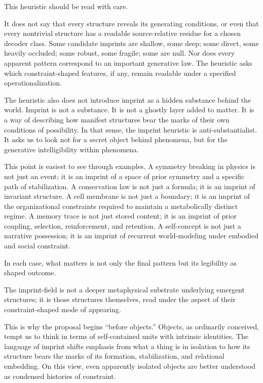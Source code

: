 \documentclass[12pt,a4paper]{article}
\begin{document}
This heuristic should be read with care.

It does not say that every structure reveals its generating conditions,
or even that every nontrivial structure has a readable source-relative
residue for a chosen decoder class. Some candidate imprints are shallow,
some deep; some direct, some heavily occluded; some robust, some fragile;
some are null. Nor does every apparent pattern correspond to an
important generative law. The heuristic asks which constraint-shaped
features, if any, remain readable under a specified operationalization.

The heuristic also does not introduce imprint as a hidden substance behind the world. Imprint is not a substance. It is not a ghostly layer added to matter. It is a way of describing how manifest structures bear the marks of their own conditions of possibility. In that sense, the imprint heuristic is anti-substantialist. It asks us to look not for a secret object behind phenomena, but for the generative intelligibility within phenomena.

This point is easiest to see through examples. A symmetry breaking in physics is not just an event; it is an imprint of a space of prior symmetry and a specific path of stabilization. A conservation law is not just a formula; it is an imprint of invariant structure. A cell membrane is not just a boundary; it is an imprint of the organizational constraints required to maintain a metabolically distinct regime. A memory trace is not just stored content; it is an imprint of prior coupling, selection, reinforcement, and retention. A self-concept is not just a narrative possession; it is an imprint of recurrent world-modeling under embodied and social constraint.

In each case, what matters is not only the final pattern but its legibility as shaped outcome.

The imprint-field is not a deeper metaphysical substrate underlying emergent structures; it is those structures themselves, read under the aspect of their constraint-shaped mode of appearing.

This is why the proposal begins ``before objects.'' Objects, as ordinarily conceived, tempt us to think in terms of self-contained units with intrinsic identities. The language of imprint shifts emphasis from what a thing is in isolation to how its structure bears the marks of its formation, stabilization, and relational embedding. On this view, even apparently isolated objects are better understood as condensed histories of constraint.
\end{document}
